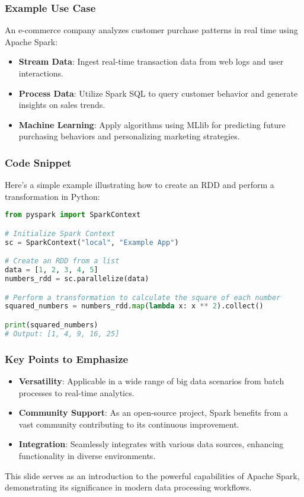 \documentclass[aspectratio=169]{beamer}
\begin{document}
\begin{frame}[fragile]
    \frametitle{Example Use Case}
    An e-commerce company analyzes customer purchase patterns in real time using Apache Spark:
    \begin{itemize}
        \item \textbf{Stream Data}: Ingest real-time transaction data from web logs and user interactions.
        \item \textbf{Process Data}: Utilize Spark SQL to query customer behavior and generate insights on sales trends.
        \item \textbf{Machine Learning}: Apply algorithms using MLlib for predicting future purchasing behaviors and personalizing marketing strategies.
    \end{itemize}
\end{frame}

\begin{frame}[fragile]
    \frametitle{Code Snippet}
    Here’s a simple example illustrating how to create an RDD and perform a transformation in Python:
    \begin{lstlisting}[language=Python]
from pyspark import SparkContext

# Initialize Spark Context
sc = SparkContext("local", "Example App")

# Create an RDD from a list
data = [1, 2, 3, 4, 5]
numbers_rdd = sc.parallelize(data)

# Perform a transformation to calculate the square of each number
squared_numbers = numbers_rdd.map(lambda x: x ** 2).collect()

print(squared_numbers)
# Output: [1, 4, 9, 16, 25]
    \end{lstlisting}
\end{frame}

\begin{frame}[fragile]
    \frametitle{Key Points to Emphasize}
    \begin{itemize}
        \item \textbf{Versatility}: Applicable in a wide range of big data scenarios from batch processes to real-time analytics.
        \item \textbf{Community Support}: As an open-source project, Spark benefits from a vast community contributing to its continuous improvement.
        \item \textbf{Integration}: Seamlessly integrates with various data sources, enhancing functionality in diverse environments.
    \end{itemize}
    This slide serves as an introduction to the powerful capabilities of Apache Spark, demonstrating its significance in modern data processing workflows.
\end{frame}
\end{document}
